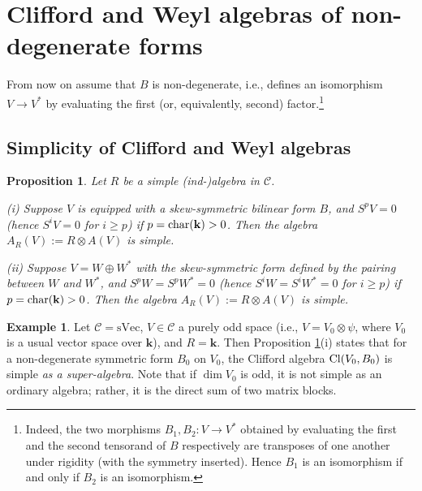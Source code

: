 \documentclass[12pt]{amsart}
\numberwithin{equation}{section}
\providecommand{\k}{}\renewcommand{\k}{\mathbf{k}}
\providecommand{\C}{}\renewcommand{\C}{\mathcal{C}}
\providecommand{\sVec}{}\renewcommand{\sVec}{\mathrm{sVec}}
\theoremstyle{plain}
\newtheorem{proposition}[theorem]{Proposition}
\theoremstyle{definition}
\newtheorem{example}[theorem]{Example}
\theoremstyle{remark}
\begin{document}
\section{Clifford and Weyl algebras of non-degenerate forms} 
From now on assume that $B$ is non-degenerate, i.e., defines an isomorphism $V\to V^*$ by evaluating the first (or, equivalently, second) factor.\footnote{Indeed, the two morphisms
$B_1,B_2:V\longrightarrow V^*$ obtained by evaluating the first and the second tensorand of $B$ respectively are transposes of one another under rigidity (with the symmetry inserted). Hence $B_1$ is an isomorphism if and only if $B_2$ is an isomorphism.}

\subsection{Simplicity of Clifford and Weyl algebras} 

\begin{proposition}\label{simplic} Let $R$ be a simple (ind-)algebra in $\C$.

(i) Suppose $V$ is equipped with a skew-symmetric bilinear form $B$, and $S^p V=0$  (hence $S^iV=0$ for $i\ge p$) if $p={\rm char}(\k)>0$.  Then the algebra $A_R(V):=R\otimes A(V)$ is simple.

(ii) Suppose $V=W\oplus W^*$ with the skew-symmetric form defined by the pairing between $W$ and $W^*$, and 
$S^pW=S^pW^*=0$ (hence $S^iW=S^iW^*=0$ for $i\ge p$) if $p={\rm char}(\k)>0$.  Then the algebra $A_R(V):=R\otimes A(V)$ is simple.
\end{proposition}

\begin{example} Let $\C=\sVec$, $V\in \C$ a purely odd space (i.e., $V=V_0\otimes \psi$, where $V_0$ is a usual vector space over $\k$), and $R=\k$. Then 
Proposition \ref{simplic}(i) states that for a non-degenerate symmetric form $B_0$ on $V_0$, the Clifford algebra ${\rm Cl}(V_0,B_0)$ is simple {\it as a super-algebra}. Note that if $\dim V_0$ is odd, 
it is not simple as an ordinary algebra; rather, it is the direct sum of two matrix blocks. 
\end{example} 
\end{document}
